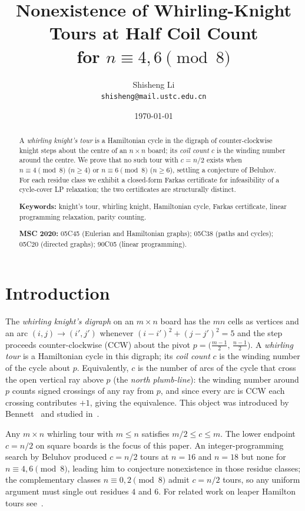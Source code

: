 \documentclass[11pt]{article}
\title{Nonexistence of Whirling-Knight Tours at Half Coil Count\\ for $n\equiv 4,6\pmod 8$}
\author{Shisheng Li\\ \small\texttt{shisheng@mail.ustc.edu.cn}}
\date{\today}
\theoremstyle{plain}
\theoremstyle{remark}
\begin{document}
\maketitle

\begin{abstract}
A \emph{whirling knight's tour} is a Hamiltonian cycle in the digraph
of counter-clockwise knight steps about the centre of an $n\times n$
board; its \emph{coil count} $c$ is the winding number around the
centre.  We prove that no such tour with $c=n/2$ exists when
$n\equiv 4\pmod 8$ ($n\ge 4$) or $n\equiv 6\pmod 8$ ($n\ge 6$),
settling a conjecture of Beluhov.  For each residue class we exhibit
a closed-form Farkas certificate for infeasibility of a cycle-cover
LP relaxation; the two certificates are structurally distinct.

\medskip\noindent
\textbf{Keywords:} knight's tour, whirling knight, Hamiltonian cycle,
Farkas certificate, linear programming relaxation, parity counting.

\medskip\noindent
\textbf{MSC 2020:} 05C45 (Eulerian and Hamiltonian graphs);
05C38 (paths and cycles); 05C20 (directed graphs); 90C05 (linear
programming).
\end{abstract}

\section{Introduction}\label{sec:intro}

The \emph{whirling knight's digraph} on an $m\times n$ board has the
$mn$ cells as vertices and an arc $(i,j)\to(i',j')$ whenever
$(i-i')^2+(j-j')^2=5$ and the step proceeds counter-clockwise (CCW)
about the pivot $p=\bigl(\tfrac{m-1}{2},\,\tfrac{n-1}{2}\bigr)$.  A
\emph{whirling tour} is a Hamiltonian cycle in this digraph; its
\emph{coil count} $c$ is the winding number of the cycle about $p$.
Equivalently, $c$ is the number of arcs of the cycle that cross the
open vertical ray above $p$ (the \emph{north plumb-line}):  the
winding number around $p$ counts signed crossings of any ray from
$p$, and since every arc is CCW each crossing contributes $+1$,
giving the equivalence.  This object was introduced
by Bennett~\cite{bennett1947} and studied
in~\cite[Exercises~227--231]{knuth-fasc8a}.

Any $m\times n$ whirling tour with $m\le n$ satisfies $m/2\le c\le m$.
The lower endpoint $c=n/2$ on square boards is the focus of this
paper.  An integer-programming search by Beluhov produced $c=n/2$
tours at $n=16$ and $n=18$ but none for $n\equiv 4,6\pmod 8$,
leading him to conjecture nonexistence in those residue classes; the
complementary classes $n\equiv 0,2\pmod 8$ admit $c=n/2$ tours, so
any uniform argument must single out residues $4$ and $6$.  For
related work on leaper Hamilton tours
see~\cite{beluhov-willcocks,beluhov-leaper}.
\end{document}
